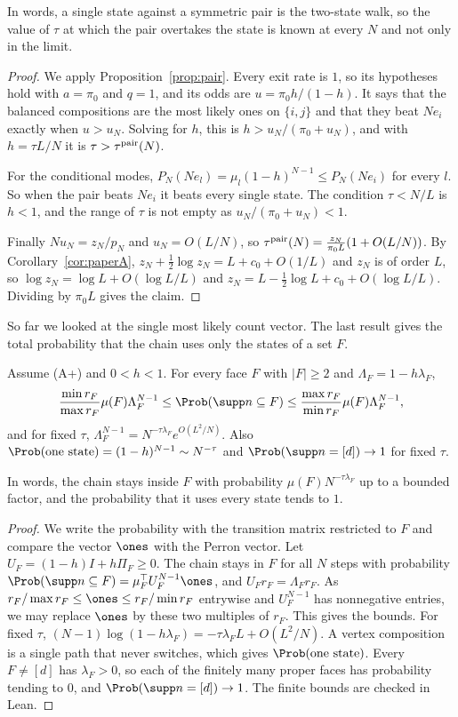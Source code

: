 In words, a single state against a symmetric pair is the two-state walk, so the
value of $\tau$ at which the pair overtakes the state is known at every $N$ and
not only in the limit.

\begin{proof}
We apply Proposition~\ref{prop:pair}. Every exit rate is $1$, so its
hypotheses hold with $a=\pi_0$ and $q=1$, and its odds are $u=\pi_0h/(1-h)$. It
says that the balanced compositions are the most likely ones on $\{i,j\}$ and
that they beat $Ne_i$ exactly when $u>u_N$. Solving for $h$, this is
$h>u_N/(\pi_0+u_N)$, and with $h=\tau L/N$ it is $\tau>\tau^{\rm pair}(N)$.

For the conditional modes, $P_N(Ne_l)=\mu_l(1-h)^{N-1}\le P_N(Ne_i)$ for every $l$.
So when the pair beats $Ne_i$ it beats every single state. The condition
$\tau<N/L$ is $h<1$, and the range of $\tau$ is not empty as
$u_N/(\pi_0+u_N)<1$.

Finally $Nu_N=z_N/p_N$ and $u_N=O(L/N)$, so
$\tau^{\rm pair}(N)=\frac{z_N}{\pi_0L}(1+O(L/N))$. By
Corollary~\ref{cor:paperA}, $z_N+\frac12\log z_N=L+c_0+O(1/L)$ and $z_N$ is of
order $L$, so $\log z_N=\log L+O(\log L/L)$ and
$z_N=L-\frac12\log L+c_0+O(\log L/L)$. Dividing by $\pi_0L$ gives the claim.
\end{proof}

So far we looked at the single most likely count vector. The last result
gives the total probability that the chain uses only the states of a set $F$.

\begin{proposition}\label{prop:mass}
Assume \textup{(A+)} and $0<h<1$. For every face $F$ with $|F|\ge2$ and
$\Lambda_F=1-h\lambda_F$,
\[
 \frac{\min r_F}{\max r_F}\mu(F)\Lambda_F^{N-1}
 \le\Prob(\supp n\subseteq F)\le
 \frac{\max r_F}{\min r_F}\mu(F)\Lambda_F^{N-1},
\]
and for fixed $\tau$, $\Lambda_F^{N-1}=N^{-\tau\lambda_F}e^{O(L^2/N)}$. Also
$\Prob(\text{one state})=(1-h)^{N-1}\sim N^{-\tau}$ and
$\Prob(\supp n=[d])\to1$ for fixed $\tau$.
\end{proposition}

In words, the chain stays inside $F$ with probability
$\mu(F)N^{-\tau\lambda_F}$ up to a bounded factor, and the probability that it
uses every state tends to $1$.

\begin{proof}
We write the probability with the transition matrix restricted to $F$ and
compare the vector $\ones$ with the Perron vector. Let
$U_F=(1-h)I+h\Pi_F\ge0$. The chain stays in $F$ for all $N$ steps with
probability $\Prob(\supp n\subseteq F)=\mu_F^{\top}U_F^{N-1}\ones$, and
$U_Fr_F=\Lambda_Fr_F$. As $r_F/\max r_F\le\ones\le r_F/\min r_F$ entrywise and
$U_F^{N-1}$ has nonnegative entries, we may replace $\ones$ by these two
multiples of $r_F$. This gives the bounds. For fixed $\tau$,
$(N-1)\log(1-h\lambda_F)=-\tau\lambda_FL+O(L^2/N)$. A vertex composition is a
single path that never switches, which gives $\Prob(\text{one state})$. Every
$F\ne[d]$ has $\lambda_F>0$, so each of the finitely many proper faces has
probability tending to $0$, and $\Prob(\supp n=[d])\to1$. The finite bounds are
checked in Lean.
\end{proof}

